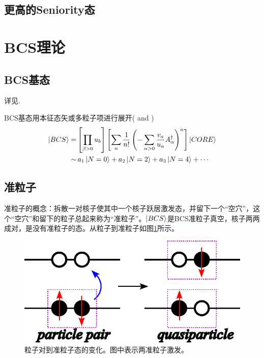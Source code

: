 \subsection{更高的Seniority态}

\section{BCS理论}

\subsection{BCS基态}
详见\citep[Sec. 13.1.1]{suhonen-NtoN}.

BCS基态用本征态矢或多粒子项进行展开(\citep[Eq. 13.5]{suhonen-NtoN} and \citep[C3.96]{ningpz})
\begin{equation}\begin{aligned}
    \Ket{BCS} =& \left[\prod_{\beta>0} u_{b}\right] \left[ \sum_{n} \frac{1}{n!} \left( -\sum_{\alpha>0}\frac{v_{a}}{u_{a}} A^{\dagger}_{\alpha} \right)^{n} \right] \Ket{CORE} \\
    \sim &\, a_1\Ket{N=0} + a_2\Ket{N=2} + a_3\Ket{N=4} + \cdots
    \label{eq:bcs-part-num}
\end{aligned}\end{equation}

\subsection{准粒子}
准粒子的概念：拆散一对核子使其中一个核子跃居激发态，并留下一个“空穴”，这个“空穴”和留下的粒子总起来称为“准粒子”。$\Ket{BCS}$是BCS准粒子真空，核子两两成对，是没有准粒子的态。从粒子到准粒子如图\cref{fig:partToquasipart}所示。
\begin{figure}[htb]
    \begin{center}
        \includegraphics[scale=0.7]{figure/nuclear/particleToquasiparticle.pdf}
    \end{center}
    \caption{粒子对到准粒子态的变化。图中表示两准粒子激发。}\label{fig:partToquasipart}
\end{figure}


